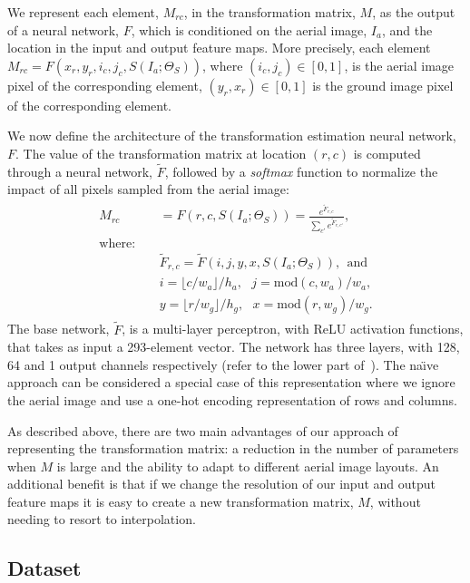 We represent each element, $M_{rc}$, in the transformation matrix,
$M$, as the output of a neural network, $F$, which is conditioned on
the aerial image, $I_a$, and the location in the input and output
feature maps. More precisely, each element $M_{rc} =
F(x_r,y_r,i_c,j_c,S(I_a;\Theta_S))$, where $(i_c, j_c) \in [0,1]$, is
the aerial image pixel of the corresponding element, $(y_r, x_r)
\in [0,1]$ is the ground image pixel of the corresponding
element.

We now define the architecture of the transformation estimation neural
network, $F$. The value of the transformation matrix at
location $(r, c)$ is computed through a neural network, $\tilde{F}$,
followed by a {\em softmax} function to normalize the impact of all
pixels sampled from the aerial image:
\begin{align*}
\begin{split}
  M_{rc} &= F\left(r, c, S(I_a; \Theta_S)\right)
  = \frac{e^{\tilde{F}_{r,c}}}{\sum_{c'}{e^{\tilde{F}_{r,c'}}}}, \\
\textrm{where:} ~~~~~&\\
  &\tilde{F}_{r, c} = \tilde{F}\left(i, j, y, x, S(I_a; \Theta_S)\right), 
  ~~\textrm{and}\\
  & i = \lfloor c / w_a \rfloor / h_a, ~~~j = \mathrm{mod}(c,w_a) / w_a, \\
  & y = \lfloor r / w_g \rfloor / h_g, ~~~x = \mathrm{mod}(r,w_g) / w_g.
\label{equ:matmul}
\end{split}
\end{align*}
The base network, $\tilde{F}$, is a multi-layer perceptron, with ReLU
activation functions, that takes as input a 293-element vector.
The network has three layers, with 128, 64 and 1 output channels
respectively (refer to the lower part of~).  The
na\"{\i}ve approach can be considered a special case of this
representation where we ignore the aerial image and use a one-hot
encoding representation of rows and columns.  

As described above, there are two main advantages of our approach of
representing the transformation matrix: a reduction in the number of
parameters when $M$ is large and the ability to adapt to different
aerial image layouts.  An additional benefit is that if we change the
resolution of our input and output feature maps it is easy to create a
new transformation matrix, $M$, without needing to resort to
interpolation.

\subsection{Dataset}
\label{sec:dataset}

